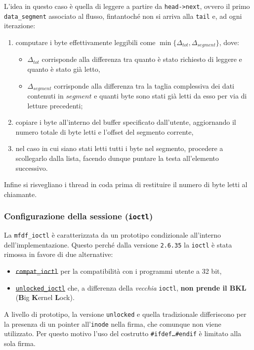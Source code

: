 \documentclass{article}
\begin{document}
L'idea in questo caso è quella di leggere a partire da \texttt{head->next}, ovvero il primo \texttt{data\_segment} associato al flusso, fintantoché non si arriva alla \texttt{tail} e, ad ogni iterazione:
\begin{enumerate}
        \item computare i byte effettivamente leggibili come $\min\lbrace\Delta_{tot}, \Delta_{segment}\rbrace$, dove:
                \begin{itemize}
                        \item $\Delta_{tot}$ corrisponde alla differenza tra quanto è stato richiesto di leggere e quanto è stato già letto,
                        \item $\Delta_{segment}$ corrisponde alla differenza tra la taglia complessiva dei dati contenuti in $segment$ e quanti byte sono stati già letti da esso per via di letture precedenti;
                \end{itemize}
        \item copiare i byte all'interno del buffer specificato dall'utente, aggiornando il numero totale di byte letti e l'offset del segmento corrente,
        \item nel caso in cui siano stati letti tutti i byte nel segmento, procedere a scollegarlo dalla lista, facendo dunque puntare la testa all'elemento successivo.
\end{enumerate}

Infine si risvegliano i thread in coda prima di restituire il numero di byte letti al chiamante.
\subsubsection{Configurazione della sessione (\texttt{ioctl})}
La \texttt{mfdf\_ioctl} è caratterizzata da un prototipo condizionale all'interno dell'implementazione. Questo perché dalla versione \texttt{2.6.35} la \texttt{ioctl} è stata rimossa in favore di due alternative:
\begin{itemize}
        \item \st{\texttt{compat\_ioctl}} per la compatibilità con i programmi utente a 32 bit,
        \item \ul{\texttt{unlocked\_ioctl}} che, a differenza della \textit{vecchia} \texttt{ioctl}, \textbf{non prende il BKL} (\textbf{B}ig \textbf{K}ernel \textbf{L}ock).
\end{itemize}

A livello di prototipo, la versione \texttt{unlocked} e quella tradizionale differiscono per la presenza di un pointer all'\texttt{inode} nella firma, che comunque non viene utilizzato. Per questo motivo l'uso del costrutto \texttt{\#ifdef\dots\#endif} è limitato alla sola firma.
\end{document}
